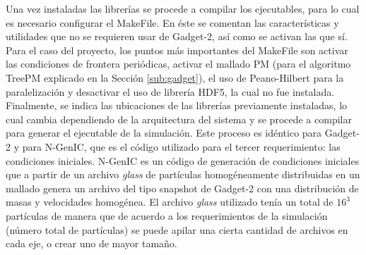 Una vez instaladas las librerías se procede a compilar los ejecutables, para lo cual es necesario configurar el MakeFile. En éste se comentan las características y utilidades que no se requieren usar de Gadget-2, así como se activan las que sí. Para el caso del proyecto, los puntos más importantes del MakeFile son activar las condiciones de frontera periódicas, activar el mallado PM (para el algoritmo TreePM explicado en la Sección \ref{sub:gadget}), el uso de Peano-Hilbert para la paralelización y desactivar el uso de librería HDF5, la cual no fue instalada. Finalmente, se indica las ubicaciones de las librerías previamente instaladas, lo cual cambia dependiendo de la arquitectura del sistema y se procede a compilar para generar el ejecutable de la simulación. Este proceso es idéntico para Gadget-2 y para N-GenIC, que es el código utilizado para el tercer requerimiento: las condiciones iniciales. N-GenIC es un código de generación de condiciones iniciales que a partir de un archivo \textit{glass} de partículas homogéneamente distribuidas en un mallado genera un archivo del tipo snapshot de Gadget-2 con una distribución de masas y velocidades homogénea. El archivo \textit{glass} utilizado tenía un total de $16^3$ partículas de manera que de acuerdo a los requerimientos de la simulación (número total de partículas) se puede apilar una cierta cantidad de archivos en cada eje, o crear uno de mayor tamaño.

